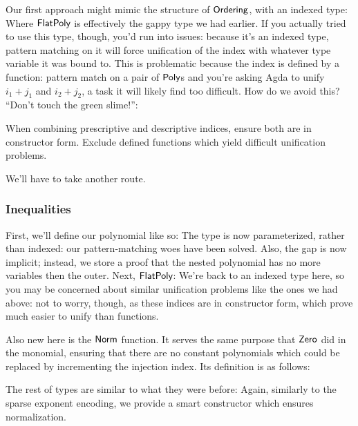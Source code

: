 \documentclass[draft, twocolumn]{article}
\theoremstyle{definition}
\begin{document}
Our first approach might mimic the structure of \(\AgdaDatatype{Ordering}\),
with an indexed type:
Where \(\AgdaDatatype{FlatPoly}\) is effectively the gappy type we had earlier.
If you actually tried to use this type, though, you'd run into issues: because
it's an indexed type, pattern matching on it will force unification of the index
with whatever type variable it was bound to. This is problematic because the
index is defined by a function: pattern match on a pair of
\(\AgdaDatatype{Poly}\)s and you're asking Agda to unify \(i_1 + j_1\) and
\(i_2 + j_2\), a task it will likely find too difficult. How do we avoid this?
``Don't touch the green slime!''\cite{mcbride_polynomial_2018}:
\begin{displayquote}
  When combining prescriptive and descriptive indices, ensure both are in
  constructor form. Exclude defined functions which yield difficult unification
  problems.
\end{displayquote}
We'll have to take another route.
\subsubsection{Inequalities}
First, we'll define our polynomial like so:
The type is now parameterized, rather than indexed: our pattern-matching woes
have been solved. Also, the gap is now implicit; instead, we store a proof that
the nested polynomial has no more variables then the outer. Next,
\(\AgdaDatatype{FlatPoly}\):
We're back to an indexed type here, so you may be concerned about similar
unification problems like the ones we had above: not to worry, though, as these
indices are in constructor form, which prove much easier to unify than
functions.

Also new here is the \(\AgdaFunction{Norm}\) function. It serves the same
purpose that \(\AgdaFunction{Zero}\) did in the monomial, ensuring that there
are no constant polynomials which could be replaced by incrementing the
injection index. Its definition is as follows:

The rest of types are similar to what they were before:
Again, similarly to the sparse exponent encoding, we provide a smart
constructor which ensures normalization.
\end{document}
